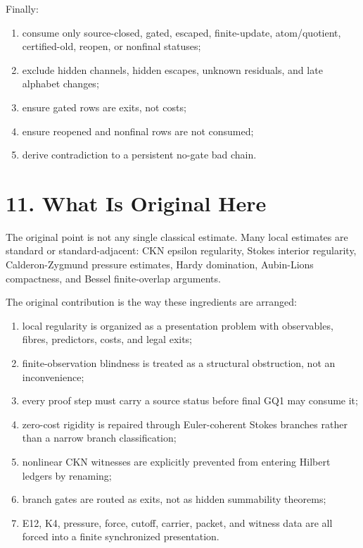 \documentclass[11pt]{article}
\begin{document}
Finally:

\begin{enumerate}
\item
  consume only source-closed, gated, escaped, finite-update, atom/quotient, certified-old, reopen, or nonfinal statuses;
\item
  exclude hidden channels, hidden escapes, unknown residuals, and late alphabet changes;
\item
  ensure gated rows are exits, not costs;
\item
  ensure reopened and nonfinal rows are not consumed;
\item
  derive contradiction to a persistent no-gate bad chain.
\end{enumerate}

\section*{11. What Is Original Here}

The original point is not any single classical estimate. Many local estimates are standard or standard-adjacent: CKN epsilon regularity, Stokes interior regularity, Calderon-Zygmund pressure estimates, Hardy domination, Aubin-Lions compactness, and Bessel finite-overlap arguments.

The original contribution is the way these ingredients are arranged:

\begin{enumerate}
\item
  local regularity is organized as a presentation problem with observables, fibres, predictors, costs, and legal exits;
\item
  finite-observation blindness is treated as a structural obstruction, not an inconvenience;
\item
  every proof step must carry a source status before final GQ1 may consume it;
\item
  zero-cost rigidity is repaired through Euler-coherent Stokes branches rather than a narrow branch classification;
\item
  nonlinear CKN witnesses are explicitly prevented from entering Hilbert ledgers by renaming;
\item
  branch gates are routed as exits, not as hidden summability theorems;
\item
  E12, K4, pressure, force, cutoff, carrier, packet, and witness data are all forced into a finite synchronized presentation.
\end{enumerate}
\end{document}
